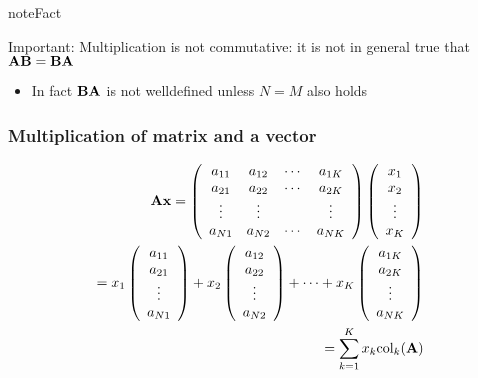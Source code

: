 \documentclass[letterpaper,10pt,english]{jupyterBook}
\begin{document}
\begin{sphinxadmonition}{note}{Fact}

\sphinxAtStartPar
Important: Multiplication is not commutative: it is not in general true that \({\bf A} {\bf B} = {\bf B} {\bf A}\)
\end{sphinxadmonition}
\begin{itemize}
\item {} 
\sphinxAtStartPar
In fact \({\bf B} {\bf A}\) is not well\sphinxhyphen{}defined unless \(N = M\) also holds

\end{itemize}


\subsubsection{Multiplication of matrix and a vector}
\label{\detokenize{05.linear_algebra:multiplication-of-matrix-and-a-vector}}\begin{equation*}
\begin{split}
%
{\bf A} {\bf x}
= 
\left(
\begin{array}{cccc}
a_{11} & a_{12} & \cdots & a_{1K} \\
a_{21} & a_{22} & \cdots & a_{2K} \\
\vdots & \vdots & & \vdots \\
a_{N1} & a_{N2} & \cdots & a_{NK} 
\end{array}
\right)
\left(
\begin{array}{c}
x_1 \\
x_2 \\
\vdots \\
x_K
\end{array}
\right)
\\
=
x_1 \left(
\begin{array}{c}
a_{11} \\
a_{21} \\
\vdots \\
a_{N1} 
\end{array}
\right)
+
x_2 \left(
\begin{array}{c}
a_{12} \\
a_{22} \\
\vdots \\
a_{N2} 
\end{array}
\right)
+ \cdots + 
x_K \left(
\begin{array}{c}
a_{1K} \\
a_{2K} \\
\vdots \\
a_{NK} 
\end{array}
\right)
\\
= 
\sum_{k=1}^K x_k \mathrm{col}_k({\bf A})
%
\end{split}
\end{equation*}
\end{document}
